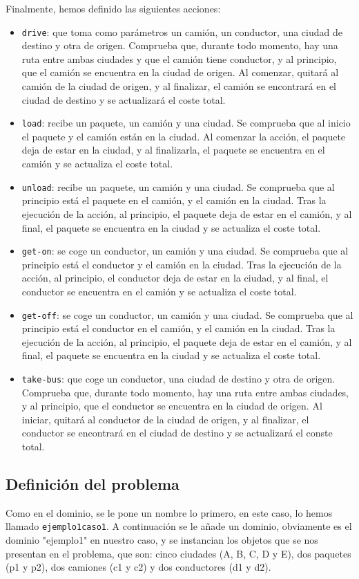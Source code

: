 \documentclass[a4paper]{article}
\begin{document}
Finalmente, hemos definido las siguientes acciones:
\begin{itemize}
\item \texttt{drive}: que toma como parámetros un camión, un conductor, una ciudad de destino y otra de origen. Comprueba que, durante todo momento, hay una ruta entre ambas ciudades y que el camión tiene conductor, y al principio, que el camión se encuentra en la ciudad de origen. Al comenzar, quitará al camión de la ciudad de origen, y al finalizar, el camión se encontrará en el ciudad de destino y se actualizará el coste total.
\item \texttt{load}: recibe un paquete, un camión y una ciudad. Se comprueba que al inicio el paquete y el camión están en la ciudad. Al comenzar la acción, el paquete deja de estar en la ciudad, y al finalizarla, el paquete se encuentra en el camión y se actualiza el coste total.
\item \texttt{unload}: recibe un paquete, un camión y una ciudad. Se comprueba que al principio está el paquete en el camión, y el camión en la ciudad. Tras la ejecución de la acción, al principio, el paquete deja de estar en el camión, y al final, el paquete se encuentra en la ciudad y se actualiza el coste total.
\item \texttt{get-on}: se coge un conductor, un camión y una ciudad. Se comprueba que al principio está el conductor y el camión en la ciudad. Tras la ejecución de la acción, al principio, el conductor deja de estar en la ciudad, y al final, el conductor se encuentra en el camión y se actualiza el coste total.
\item \texttt{get-off}: se coge un conductor, un camión y una ciudad. Se comprueba que al principio está el conductor en el camión, y el camión en la ciudad. Tras la ejecución de la acción, al principio, el paquete deja de estar en el camión, y al final, el paquete se encuentra en la ciudad y se actualiza el coste total.
\item \texttt{take-bus}: que coge un conductor, una ciudad de destino y otra de origen. Comprueba que, durante todo momento, hay una ruta entre ambas ciudades, y al principio, que el conductor se encuentra en la ciudad de origen. Al iniciar, quitará al conductor de la ciudad de origen, y al finalizar, el conductor se encontrará en el ciudad de destino y se actualizará el conste total.
\end{itemize}
\subsection{Definición del problema}
Como en el dominio, se le pone un nombre lo primero, en este caso, lo hemos llamado \texttt{ejemplo1caso1}. A continuación se le añade un dominio, obviamente es el dominio "ejemplo1" en nuestro caso, y se instancian los objetos que se nos presentan en el problema, que son: cinco ciudades (A, B, C, D y E), dos paquetes (p1 y p2), dos camiones (c1 y c2) y dos conductores (d1 y d2).
\end{document}
